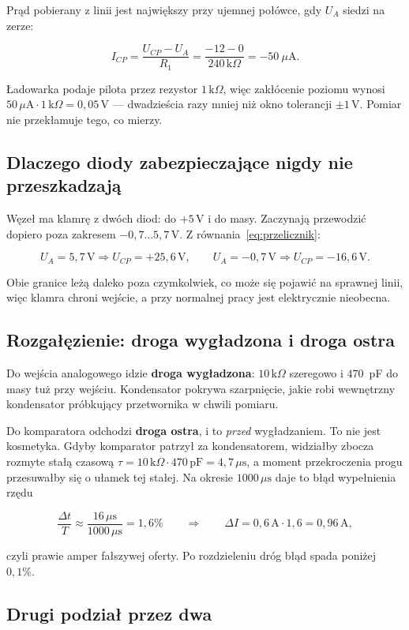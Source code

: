 \documentclass[a4paper,11pt]{article}
\newcommand{\kohm}{\,\mathrm{k}\Omega}
\newcommand{\volt}{\,\mathrm{V}}
\newcommand{\amp}{\,\mathrm{A}}
\newcommand{\us}{\,\mu\mathrm{s}}
\begin{document}
Prąd pobierany z linii jest największy przy ujemnej połówce, gdy $U_A$ siedzi
na zerze:

\[
I_{CP}=\frac{U_{CP}-U_A}{R_1}=\frac{-12-0}{240\kohm}=-50\ \mu\mathrm{A}.
\]

Ładowarka podaje pilota przez rezystor $1\kohm$, więc zakłócenie poziomu wynosi
$50\,\mu\mathrm{A}\cdot 1\kohm = 0{,}05\volt$ --- dwadzieścia razy mniej niż okno
tolerancji $\pm1\volt$. Pomiar nie przekłamuje tego, co mierzy.

\subsection{Dlaczego diody zabezpieczające nigdy nie przeszkadzają}

Węzeł ma klamrę z dwóch diod: do $+5\volt$ i do masy. Zaczynają przewodzić dopiero
poza zakresem $-0{,}7\ldots5{,}7\volt$. Z równania~\eqref{eq:przelicznik}:

\[
U_A=5{,}7\volt \Rightarrow U_{CP}=+25{,}6\volt,
\qquad
U_A=-0{,}7\volt \Rightarrow U_{CP}=-16{,}6\volt .
\]

Obie granice leżą daleko poza czymkolwiek, co może się pojawić na sprawnej linii,
więc klamra chroni wejście, a przy normalnej pracy jest elektrycznie nieobecna.

\subsection{Rozgałęzienie: droga wygładzona i droga ostra}

Do wejścia analogowego idzie \textbf{droga wygładzona}: $10\kohm$ szeregowo
i $470$~pF do masy tuż przy wejściu. Kondensator pokrywa szarpnięcie, jakie robi
wewnętrzny kondensator próbkujący przetwornika w chwili pomiaru.

Do komparatora odchodzi \textbf{droga ostra}, i to \emph{przed} wygładzaniem.
To nie jest kosmetyka. Gdyby komparator patrzył za kondensatorem, widziałby zbocza
rozmyte stałą czasową $\tau = 10\kohm\cdot470\,\mathrm{pF}=4{,}7\us$, a moment
przekroczenia progu przesuwałby się o ułamek tej stałej. Na okresie $1000\us$
daje to błąd wypełnienia rzędu

\[
\frac{\Delta t}{T}\approx\frac{16\us}{1000\us}=1{,}6\%
\qquad\Rightarrow\qquad
\Delta I = 0{,}6\amp\cdot1{,}6 = 0{,}96\amp,
\]

czyli prawie amper fałszywej oferty. Po rozdzieleniu dróg błąd spada poniżej
$0{,}1\%$.

\subsection{Drugi podział przez dwa}
\end{document}
